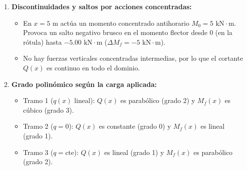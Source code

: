 {\begin{enumerate}
\begin{itemize}
                  \item Rótula interna ($x = 5\text{ m}$): El momento flector se anula por la izquierda de la articulación: $M_f(5^-) = 0$.

                  \item Empotramiento derecho $B$ ($x = 8\text{ m}$): El cortante cierra en $Q(8) = -42.00\text{ kN}$ (equilibrado por $V_B = 42.00\text{ kN}$ ascendente) y el momento flector cierra en $M_f(8) = -86.00\text{ kN}\cdot\text{m}$, coincidiendo en módulo y sentido con el momento de reacción $M_B = 86.00\text{ kN}\cdot\text{m}$.

              \end{itemize}



        \item \textbf{Discontinuidades y saltos por acciones concentradas:}

              \begin{itemize}

                  \item En $x = 5\text{ m}$ actúa un momento concentrado antihorario $M_0 = 5\text{ kN}\cdot\text{m}$. Provoca un salto negativo brusco en el momento flector desde $0$ (en la rótula) hasta $-5.00\text{ kN}\cdot\text{m}$ ($\Delta M_f = -5\text{ kN}\cdot\text{m}$).

                  \item No hay fuerzas verticales concentradas intermedias, por lo que el cortante $Q(x)$ es continuo en todo el dominio.

              \end{itemize}



        \item \textbf{Grado polinómico según la carga aplicada:}

              \begin{itemize}

                  \item Tramo 1 ($q(x)$ lineal): $Q(x)$ es parabólico (grado 2) y $M_f(x)$ es cúbico (grado 3).

                  \item Tramo 2 ($q = 0$): $Q(x)$ es constante (grado 0) y $M_f(x)$ es lineal (grado 1).

                  \item Tramo 3 ($q = \text{cte}$): $Q(x)$ es lineal (grado 1) y $M_f(x)$ es parabólico (grado 2).

              \end{itemize}

    \end{enumerate}

}



